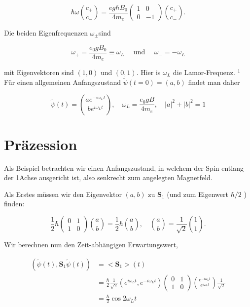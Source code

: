 \documentclass[10pt, letterpaper]{article}
\begin{document}
$$
\hbar \omega\binom{c_{+}}{c_{-}}=\frac{e g \hbar B_{0}}{4 m_{e}}\left(\begin{array}{cc}
1 & 0 \\
0 & -1
\end{array}\right)\binom{c_{+}}{c_{-}} .
$$

Die beiden Eigenfrequenzen $\omega_{ \pm}$sind

$$
\omega_{+}=\frac{e_{0} g B_{0}}{4 m_{e}} \equiv \omega_{L} \quad \text { und } \quad \omega_{-}=-\omega_{L}
$$

mit Eigenvektoren sind $(1,0)$ und $(0,1)$. Hier is $\omega_{L}$ die Lamor-Frequenz. ${ }^{1}$ Für einen allgemeinen Anfangszustand $\tilde{\psi}(t=0)=(a, b)$ findet man daher

$$
\tilde{\psi}(t)=\binom{a e^{-i \omega_{L} t}}{b e^{i \omega_{L} t}}, \quad \omega_{L}=\frac{e_{0} g B}{4 m_{e}}, \quad|a|^{2}+|b|^{2}=1
$$

\section*{Präzession}
Als Beispiel betrachten wir einen Anfangszustand, in welchem der Spin entlang der 1Achse ausgericht ist, also senkrecht zum angelegten Magnetfeld.

Als Erstes müssen wir den Eigenvektor $(a, b)$ zu $\mathbf{S}_{1}$ (und zum Eigenwert $\hbar / 2$ ) finden:

$$
\frac{1}{2} \hbar\left(\begin{array}{ll}
0 & 1 \\
1 & 0
\end{array}\right)\binom{a}{b}=\frac{1}{2} \hbar\binom{a}{b}, \quad\binom{a}{b}=\frac{1}{\sqrt{2}}\binom{1}{1} .
$$

Wir berechnen nun den Zeit-abhängigen Erwartungswert,

$$
\begin{aligned}
\left(\tilde{\psi}(t), \mathbf{S}_{1} \tilde{\psi}(t)\right) & =<\mathbf{S}_{1}>(t) \\
& =\frac{\hbar}{2} \frac{1}{\sqrt{2}}\left(e^{i \omega_{L} t}, e^{-i \omega_{L} t}\right)\left(\begin{array}{cc}
0 & 1 \\
1 & 0
\end{array}\right)\binom{e^{-i \omega_{L} t}}{e^{i \omega_{L} t}} \frac{1}{\sqrt{2}} \\
& =\frac{\hbar}{2} \cos 2 \omega_{L} t
\end{aligned}
$$
\end{document}

